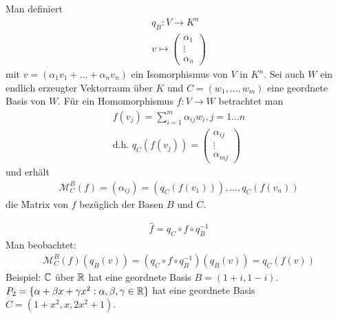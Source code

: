 Man definiert 
\begin{align}
q_B: V \rightarrow K^n \\
v \mapsto \begin{pmatrix} \alpha_1 \\ \vdots \\ \alpha_n \end{pmatrix}
\end{align}
mit $v = (\alpha_1 v_1 + ... + \alpha_n v_n)$ ein Isomorphismus von $V$ in $K^n$.
Sei auch $W$ ein endlich erzeugter Vektorraum über $K$ und $C = (w_1, ..., w_m)$ eine geordnete Basis von $W$.
Für ein Homomorphismus $f: V \rightarrow W$ betrachtet man 
\begin{align}
f(v_j) = \sum_{i = 1}^{m} \alpha_{ij} w_i, j=1...n \\
\text{d.h. } q_C (f(v_j)) = \begin{pmatrix} \alpha_{ij} \\ \vdots \\ \alpha_{mj} \end{pmatrix}
\end{align}
und erhält
\begin{align}
\mathcal{M}_{C}^{B} (f) = (\alpha_{ij}) = (q_C(f(v_1))), ..., q_C(f(v_n))
\end{align}
die \f{Matrix von $f$ bezüglich der Basen $B$ und $C$}.
\begin{center}
\end{center}
\begin{align}
\hat{f} = q_C \circ f \circ q_{B}^{-1}
\end{align}
Man beobachtet:
\begin{align}
\mathcal{M}_{C}^{B} (f) (q_B(v)) = (q_C \circ f \circ q_{B}^{-1})(q_{B}(v)) = q_C(f(v))
\end{align}
Beispiel: $\mathbb{C}$ über $\mathbb{R}$ hat eine geordnete Basis $B = (1+i, 1-i)$. $P_2 = \{\alpha + \beta x + \gamma x^2: \alpha, \beta, \gamma \in \mathbb{R}\}$ hat eine geordnete Basis $C = (1+x^2, x, 2x^2 + 1)$. \\
